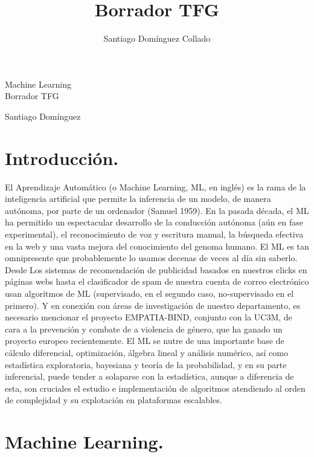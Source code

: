 \documentclass[a4paper,10pt]{article}
\author{Santiago Domínguez Collado}
\title{Borrador TFG}
\begin{document}
\begin{center}
\begin{LARGE}
Machine Learning \\
\vspace*{0.15in}
\UseRawInputEncoding
Borrador TFG
\end{LARGE}
\end{center}
\begin{center}
\begin{large}
Santiago Domínguez
\end{large}
\end{center}


\tableofcontents




\section{Introducción.}
El Aprendizaje Automático (o Machine Learning, ML, en inglés) es la rama de la inteligencia artificial que permite la inferencia de un modelo, de manera autónoma, por parte de un ordenador (Samuel 1959). En la pasada década, el ML ha permitido un espectacular desarrollo de la conducción autónoma (aún en fase experimental), el reconocimiento de voz y escritura manual, la búsqueda efectiva en la web y una vasta mejora del conocimiento del genoma humano. El ML es tan omnipresente que probablemente lo usamos decenas de veces al día sin saberlo. Desde Los sistemas de recomendación de publicidad basados en nuestros clicks en páginas webs hasta el clasificador de spam de nuestra cuenta de correo electrónico usan algoritmos de ML (supervisado, en el segundo caso, no-supervisado en el primero). Y en conexión con áreas de investigación de nuestro departamento, es necesario mencionar el proyecto EMPATIA-BIND, conjunto con la UC3M, de cara a la prevención y combate de a violencia de género, que ha ganado un proyecto europeo recientemente.
El ML se nutre de una importante base de cálculo diferencial, optimización, álgebra lineal y análisis numérico, así como estadística exploratoria, bayesiana y teoría de la probabilidad, y en su parte inferencial, puede tender a solaparse con la estadística, aunque a diferencia de esta, son cruciales el estudio e implementación de algoritmos atendiendo al orden de complejidad y su explotación en plataformas escalables.
\newpage
\section{Machine Learning.}
\end{document}
